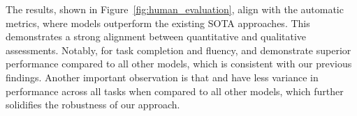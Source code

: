 The results, shown in Figure~\ref{fig:human_evaluation}, align with the automatic metrics, where {\oursys} models outperform the existing SOTA approaches. This demonstrates a strong alignment between quantitative and qualitative assessments. Notably, for task completion and fluency, {\llamai} and {\flan} demonstrate superior performance compared to all other models, which is consistent with our previous findings. Another important observation is that {\llamai} and {\flan} have less variance in performance across all tasks when compared to all other models, which further solidifies the robustness of our approach. 


